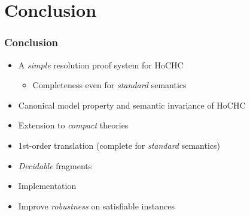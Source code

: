 \documentclass{beamer}
\begin{document}
\section{Conclusion}
\begin{frame}
  \frametitle{Conclusion}


  
  \begin{itemize}
  \item A \emph{simple} resolution proof system for HoCHC
    \begin{itemize}
    \item Completeness even for \emph{standard} semantics
    \end{itemize}
  \item Canonical model property and semantic invariance of HoCHC
  \end{itemize}
  \pause
  \begin{itemize}
  \item Extension to \emph{compact} theories
  \item 1st-order translation (complete for \emph{standard}
    semantics)
  \item \emph{Decidable} fragments
  \end{itemize}
  \pause
  \begin{itemize}
  \item Implementation
  \item Improve \textit{robustness} on satisfiable instances
  \end{itemize}
  \vspace{15pt}
\end{frame}

\end{document}

